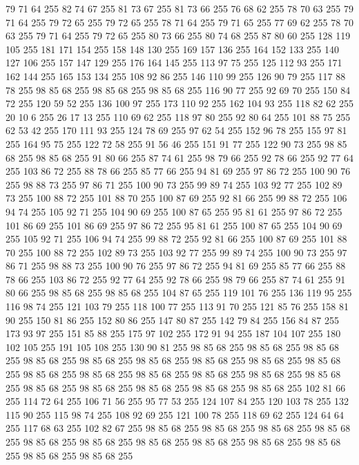 79 71 64 255 82 74 67 255 81 73 67 255 81 73 66 255 76 68 62 255 78 70 63 255 79 71 64 255 79 72 65 255 79 72 65 255 78 71 64 255 79 71 65 255 77 69 62 255 78 70 63 255 79 71 64 255 79 72 65 255 80 73 66 255 80 74 68 255 87 80 60 255 128 119 105 255 181 171 154 255 158 148 130 255 169 157 136 255 164 152 133 255 140 127 106 255 157 147 129 255 176 164 145 255 113 97 75 255 125 112 93 255 171 162 144 255 165 153 134 255 108 92 86 255 146 110 99 255 126 90 79 255 117 88 78 255 98 85 68 255 98 85 68 255 98 85 68 255 116 90 77 255 92 69 70 255 150 84 72 255 120 59 52 255 136 100 97 255 173 110 92 255 162 104 93 255 118 82 62 255 20 10 6 255 26 17 13 255 110 69 62 255 118 97 80 255 92 80 64 255 101 88 75 255 62 53 42 255 170 111 93 255 124 78 69 255 97 62 54 255 152 96 78 255 155 97 81 255 164 95 75 255 122 72 58 255 91 56 46 255 151 91 77 255 122 90 73 255 98 85 68 255 98 85 68 255
91 80 66 255 87 74 61 255 98 79 66 255 92 78 66 255 92 77 64 255 103 86 72 255 88 78 66 255 85 77 66 255 94 81 69 255 97 86 72 255 100 90 76 255 98 88 73 255 97 86 71 255 100 90 73 255 99 89 74 255 103 92 77 255 102 89 73 255 100 88 72 255 101 88 70 255 100 87 69 255 92 81 66 255 99 88 72 255 106 94 74 255 105 92 71 255 104 90 69 255 100 87 65 255 95 81 61 255 97 86 72 255 101 86 69 255 101 86 69 255 97 86 72 255 95 81 61 255 100 87 65 255 104 90 69 255 105 92 71 255 106 94 74 255 99 88 72 255 92 81 66 255 100 87 69 255 101 88 70 255 100 88 72 255 102 89 73 255 103 92 77 255 99 89 74 255 100 90 73 255 97 86 71 255 98 88 73 255 100 90 76 255 97 86 72 255 94 81 69 255 85 77 66 255 88 78 66 255 103 86 72 255 92 77 64 255 92 78 66 255 98 79 66 255 87 74 61 255 91 80 66 255 98 85 68 255 98 85 68 255 104 87 65 255 119 101 76 255 136 119 95 255 116 98 74 255
121 103 79 255 118 100 77 255 113 91 70 255 121 85 76 255 158 81 90 255 150 81 86 255 152 80 86 255 147 80 87 255 142 79 84 255 156 84 87 255 173 93 97 255 151 85 88 255 175 97 102 255 172 91 94 255 187 104 107 255 180 102 105 255 191 105 108 255 130 90 81 255 98 85 68 255 98 85 68 255 98 85 68 255 98 85 68 255 98 85 68 255 98 85 68 255 98 85 68 255 98 85 68 255 98 85 68 255 98 85 68 255 98 85 68 255 98 85 68 255 98 85 68 255 98 85 68 255 98 85 68 255 98 85 68 255 98 85 68 255 98 85 68 255 98 85 68 255 98 85 68 255 102 81 66 255 114 72 64 255 106 71 56 255 95 77 53 255 124 107 84 255 120 103 78 255 132 115 90 255 115 98 74 255 108 92 69 255 121 100 78 255 118 69 62 255 124 64 64 255 117 68 63 255 102 82 67 255 98 85 68 255 98 85 68 255 98 85 68 255 98 85 68 255 98 85 68 255 98 85 68 255 98 85 68 255 98 85 68 255 98 85 68 255 98 85 68 255 98 85 68 255 98 85 68 255
